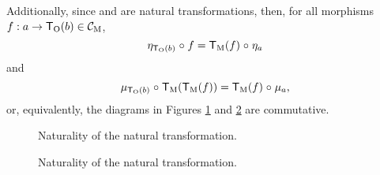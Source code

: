\begin{definition}
  Additionally, since \nat{\eta} and \nat{\mu} are natural
  transformations, then, for all morphisms $f: a \to \mathsf{T}_{\operatorname{O}}(b) \in
  \mathcal{C}_{\operatorname{M}}$,
  \begin{equation}
    \label{eq:monad-naturality-unit}
    \eta_{\mathsf{T}_{\operatorname{O}}(b)} \mathrel{\circ} f = \mathsf{T}_{\operatorname{M}}(f) \mathrel{\circ} \eta_{a}
  \end{equation}
  and
  \begin{equation}
    \label{eq:monad-naturality-multiplication}
    \mu_{\mathsf{T}_{\operatorname{O}}(b)} \mathrel{\circ} \mathsf{T}_{\operatorname{M}}(\mathsf{T}_{\operatorname{M}}(f)) = \mathsf{T}_{\operatorname{M}}(f) \mathrel{\circ} \mu_{a}
    \text{,}
  \end{equation}
  or, equivalently, the diagrams in Figures
  \ref{fig:monad-naturality-unit} and
  \ref{fig:monad-naturality-multiplication} are commutative.
  \begin{figure}[htb]
    \begin{center}
    \end{center}
    \caption{Naturality of the \nat{\eta} natural transformation.}
    \label{fig:monad-naturality-unit}
  \end{figure}
  \begin{figure}[htb]
    \begin{center}
    \end{center}
    \caption{Naturality of the \nat{\mu} natural transformation.}
    \label{fig:monad-naturality-multiplication}
  \end{figure}
\end{definition}

